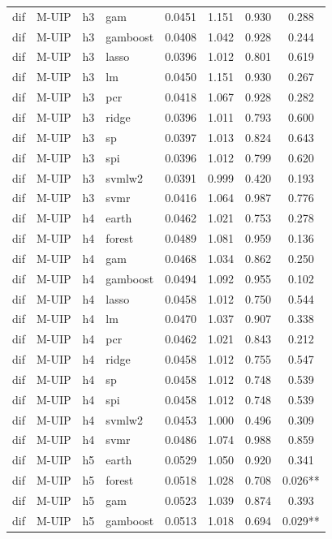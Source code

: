 \begin{ThreePartTable}
\begin{longtable}[t]{llclcccc}
dif & M-UIP & h3 & gam & 0.0451 & 1.151 & 0.930 & 0.288\\
dif & M-UIP & h3 & gamboost & 0.0408 & 1.042 & 0.928 & 0.244\\
dif & M-UIP & h3 & lasso & 0.0396 & 1.012 & 0.801 & 0.619\\
dif & M-UIP & h3 & lm & 0.0450 & 1.151 & 0.930 & 0.267\\
dif & M-UIP & h3 & pcr & 0.0418 & 1.067 & 0.928 & 0.282\\
dif & M-UIP & h3 & ridge & 0.0396 & 1.011 & 0.793 & 0.600\\
dif & M-UIP & h3 & sp & 0.0397 & 1.013 & 0.824 & 0.643\\
dif & M-UIP & h3 & spi & 0.0396 & 1.012 & 0.799 & 0.620\\
dif & M-UIP & h3 & svmlw2 & 0.0391 & 0.999 & 0.420 & 0.193\\
dif & M-UIP & h3 & svmr & 0.0416 & 1.064 & 0.987 & 0.776\\
\addlinespace
dif & M-UIP & h4 & earth & 0.0462 & 1.021 & 0.753 & 0.278\\
dif & M-UIP & h4 & forest & 0.0489 & 1.081 & 0.959 & 0.136\\
dif & M-UIP & h4 & gam & 0.0468 & 1.034 & 0.862 & 0.250\\
dif & M-UIP & h4 & gamboost & 0.0494 & 1.092 & 0.955 & 0.102\\
dif & M-UIP & h4 & lasso & 0.0458 & 1.012 & 0.750 & 0.544\\
dif & M-UIP & h4 & lm & 0.0470 & 1.037 & 0.907 & 0.338\\
dif & M-UIP & h4 & pcr & 0.0462 & 1.021 & 0.843 & 0.212\\
dif & M-UIP & h4 & ridge & 0.0458 & 1.012 & 0.755 & 0.547\\
dif & M-UIP & h4 & sp & 0.0458 & 1.012 & 0.748 & 0.539\\
dif & M-UIP & h4 & spi & 0.0458 & 1.012 & 0.748 & 0.539\\
dif & M-UIP & h4 & svmlw2 & 0.0453 & 1.000 & 0.496 & 0.309\\
dif & M-UIP & h4 & svmr & 0.0486 & 1.074 & 0.988 & 0.859\\
\addlinespace
dif & M-UIP & h5 & earth & 0.0529 & 1.050 & 0.920 & 0.341\\
dif & M-UIP & h5 & forest & 0.0518 & 1.028 & 0.708 & 0.026**\\
dif & M-UIP & h5 & gam & 0.0523 & 1.039 & 0.874 & 0.393\\
dif & M-UIP & h5 & gamboost & 0.0513 & 1.018 & 0.694 & 0.029**\\

\end{longtable}
\end{ThreePartTable}
